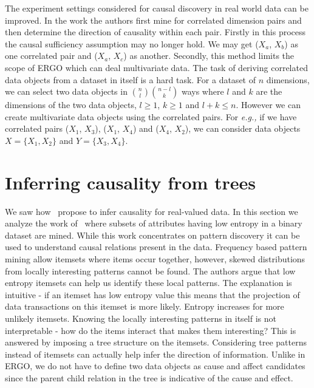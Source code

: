 \documentclass[10pt]{article}
\begin{document}
\par The experiment settings considered for causal discovery in real world data can be improved. In the work the authors first mine for correlated dimension pairs and then determine the direction of causality within each pair. Firstly in this process the causal sufficiency assumption may no longer hold. We may get ($X_a$, $X_b$) as one correlated pair and ($X_a$, $X_c$) as another. Secondly, this method limits the scope of ERGO which can deal multivariate data. The task of deriving correlated data objects from a dataset in itself is a hard task. For a dataset of $n$ dimensions, we can select two data objects in $\binom nl \binom {n-l}k$ ways where $l$ and $k$ are the dimensions of the two data objects, $l \geq 1$, $k \geq 1$ and $l+k \leq n$. However we can create multivariate data objects using the correlated pairs. For \emph{e.g.,} if we have correlated pairs ($X_1$, $X_3$), ($X_1$, $X_4$) and ($X_4$, $X_2$), we can consider data objects $X = \{X_1, X_2\}$ and $Y = \{X_3, X_4\}$. 

\section{Inferring causality from trees}
\par We saw how~\citet{vreeken2015causal} propose to infer causality for real-valued data. In this section we analyze the work of~\citet{heikinheimo2007finding} where subsets of attributes having low entropy in a binary dataset are mined. While this work concentrates on pattern discovery it can be used to understand causal relations present in the data. Frequency based pattern mining allow itemsets where items occur together, however, skewed distributions from locally interesting patterns cannot be found. The authors argue that low entropy itemsets can help us identify these local patterns. The explanation is intuitive - if an itemset has low entropy value this means that the projection of data transactions on this itemset is more likely. Entropy increases for more unlikely itemsets. Knowing the locally  interesting patterns in itself is not interpretable - how do the items interact that makes them interesting? This is answered by imposing a tree structure on the itemsets. Considering tree patterns instead of itemsets can actually help infer the direction of information. Unlike in ERGO, we do not have to define two data objects as cause and affect candidates since the parent child relation in the tree is indicative of the cause and effect.
\end{document}
